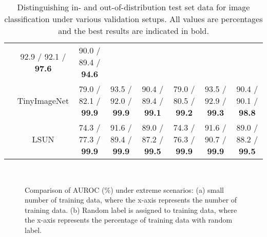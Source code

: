 \documentclass{article}
\begin{document}
\begin{table}[t]
{\begin{tabular}{ccccc|ccc}
& \multicolumn{1}{c}{92.9 / 92.1 / {\bf 97.6}}
& \multicolumn{1}{c}{90.0 / 89.4 / {\bf 94.6}} \\
&  TinyImageNet 
& \multicolumn{1}{c}{79.0 / 82.1 / {\bf 99.9}}
& \multicolumn{1}{c}{93.5 / 92.0 / {\bf 99.9}}
& \multicolumn{1}{c|}{90.4 / 89.4 / {\bf 99.1}}      
& \multicolumn{1}{c}{79.0 / 80.5 / {\bf 99.2}}
& \multicolumn{1}{c}{93.5 / 92.9 / {\bf 99.3}}
& \multicolumn{1}{c}{90.4 / 90.1 / {\bf 98.8}} \\
&  LSUN         
& \multicolumn{1}{c}{74.3 / 77.3 / {\bf 99.9}}
& \multicolumn{1}{c}{91.6 / 89.4 / {\bf 99.9}}
& \multicolumn{1}{c|}{89.0 / 87.2 / {\bf 99.5}}           
& \multicolumn{1}{c}{74.3 / 76.3 / {\bf 99.9}}
& \multicolumn{1}{c}{91.6 / 90.7 / {\bf 99.9}}
& \multicolumn{1}{c}{89.0 / 88.2 / {\bf 99.5}} \\ \bottomrule
\end{tabular}}
\vspace{+0.05in}
\caption{Distinguishing in- and out-of-distribution test set data for image classification under various validation setups. All values are percentages and the best results are indicated in bold.}
\label{tbl:OOD_total}
\end{table}

\begin{figure*} [t] \centering\setlength{\tabcolsep}{0cm}
\,
\caption{Comparison of AUROC (\%) under extreme scenarios: (a) small number of training data, where the x-axis represents the number of training data. (b) Random label is assigned to training data, where the x-axis represents the percentage of training data with random label.}
\label{fig:resnet_c10_small}
\end{figure*}
\end{document}
